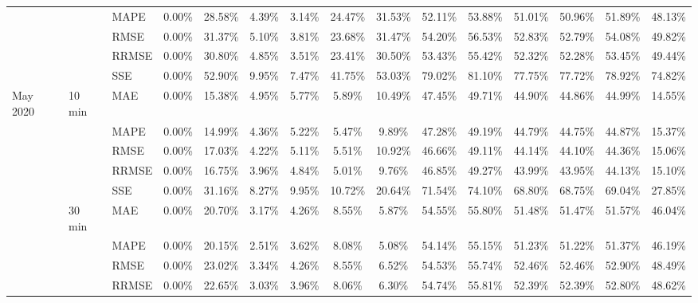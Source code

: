 {\begin{longtable}[htb!]{lllcccccccccccc}
{} & {} & {MAPE} & {0.00\%} & {28.58\%} & {4.39\%} & {3.14\%} & {24.47\%} & {31.53\%} & {52.11\%} & {53.88\%} & {51.01\%} & {50.96\%} & {51.89\%} & {48.13\%} \\
{} & {} & {RMSE} & {0.00\%} & {31.37\%} & {5.10\%} & {3.81\%} & {23.68\%} & {31.47\%} & {54.20\%} & {56.53\%} & {52.83\%} & {52.79\%} & {54.08\%} & {49.82\%} \\
{} & {} & {RRMSE} & {0.00\%} & {30.80\%} & {4.85\%} & {3.51\%} & {23.41\%} & {30.50\%} & {53.43\%} & {55.42\%} & {52.32\%} & {52.28\%} & {53.45\%} & {49.44\%} \\
&  & {SSE} & {0.00\%} & {52.90\%} & {9.95\%} & {7.47\%} & {41.75\%} & {53.03\%} & {79.02\%} & {81.10\%} & {77.75\%} & {77.72\%} & {78.92\%} & {74.82\%} \\ \hline
{May 2020} & {10 min} & {MAE} & {0.00\%} & {15.38\%} & {4.95\%} & {5.77\%} & {5.89\%} & {10.49\%} & {47.45\%} & {49.71\%} & {44.90\%} & {44.86\%} & {44.99\%} & {14.55\%} \\
{} & {} & {MAPE} & {0.00\%} & {14.99\%} & {4.36\%} & {5.22\%} & {5.47\%} & {9.89\%} & {47.28\%} & {49.19\%} & {44.79\%} & {44.75\%} & {44.87\%} & {15.37\%} \\
{} & {} & {RMSE} & {0.00\%} & {17.03\%} & {4.22\%} & {5.11\%} & {5.51\%} & {10.92\%} & {46.66\%} & {49.11\%} & {44.14\%} & {44.10\%} & {44.36\%} & {15.06\%} \\
{} & {} & {RRMSE} & {0.00\%} & {16.75\%} & {3.96\%} & {4.84\%} & {5.01\%} & {9.76\%} & {46.85\%} & {49.27\%} & {43.99\%} & {43.95\%} & {44.13\%} & {15.10\%} \\
{} &  & {SSE} & {0.00\%} & {31.16\%} & {8.27\%} & {9.95\%} & {10.72\%} & {20.64\%} & {71.54\%} & {74.10\%} & {68.80\%} & {68.75\%} & {69.04\%} & {27.85\%} \\
{} & {30 min} & {MAE} & {0.00\%} & {20.70\%} & {3.17\%} & {4.26\%} & {8.55\%} & {5.87\%} & {54.55\%} & {55.80\%} & {51.48\%} & {51.47\%} & {51.57\%} & {46.04\%} \\
{} & {} & {MAPE} & {0.00\%} & {20.15\%} & {2.51\%} & {3.62\%} & {8.08\%} & {5.08\%} & {54.14\%} & {55.15\%} & {51.23\%} & {51.22\%} & {51.37\%} & {46.19\%} \\
{} & {} & {RMSE} & {0.00\%} & {23.02\%} & {3.34\%} & {4.26\%} & {8.55\%} & {6.52\%} & {54.53\%} & {55.74\%} & {52.46\%} & {52.46\%} & {52.90\%} & {48.49\%} \\
{} & {} & {RRMSE} & {0.00\%} & {22.65\%} & {3.03\%} & {3.96\%} & {8.06\%} & {6.30\%} & {54.74\%} & {55.81\%} & {52.39\%} & {52.39\%} & {52.80\%} & {48.62\%} \\

\end{longtable}}

